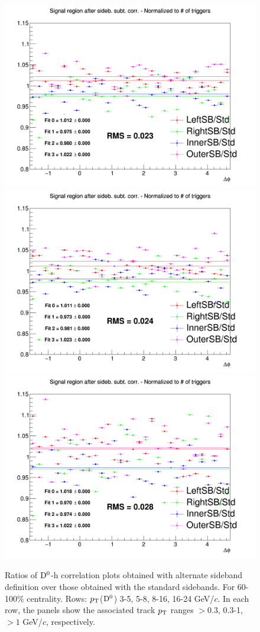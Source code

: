 \begin{figure}
{\includegraphics[width=0.31\linewidth]{figuresVsCent/Dzero/SystSideb/60100/Ratio_AzimCorrDistr_Dzero_Canvas_PtIntBins9to11_PoolInt_thr03to99.png}}
{\includegraphics[width=0.31\linewidth]{figuresVsCent/Dzero/SystSideb/60100/Ratio_AzimCorrDistr_Dzero_Canvas_PtIntBins9to11_PoolInt_thr03to1.png}}
{\includegraphics[width=0.31\linewidth]{figuresVsCent/Dzero/SystSideb/60100/Ratio_AzimCorrDistr_Dzero_Canvas_PtIntBins9to11_PoolInt_thr1to99.png}}  \\
 \caption{Ratios of ${\rm D^0}$-h correlation plots obtained with alternate sideband definition over those obtained with the standard sidebands. For 60-100\% centrality. Rows: $p_{\rm T}$(${\rm D^0}$) 3-5, 5-8, 8-16, 16-24 GeV/$c$. In each row, the panels show the associated track $p_{\rm T}$ ranges $> 0.3$, 0.3-1, $> 1$ GeV/$c$, respectively.}
\label{fig:SysBkg60100}
\end{figure}




